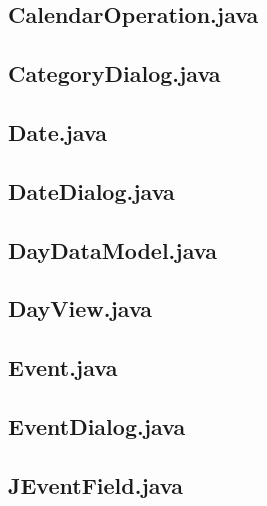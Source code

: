 \documentclass{article}
\begin{document}


\subsection{CalendarOperation.java}



\subsection{CategoryDialog.java}



\subsection{Date.java}



\subsection{DateDialog.java}



\subsection{DayDataModel.java}



\subsection{DayView.java}



\subsection{Event.java}



\subsection{EventDialog.java}



\subsection{JEventField.java}
\end{document}
